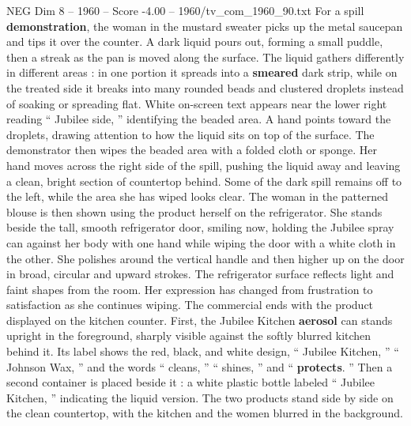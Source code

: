 \begin{textsample}{NEG Dim 8 – 1960 – Score -4.00 – 1960/tv\_com\_1960\_90.txt}
For a spill \textbf{demonstration}, the woman in the mustard sweater picks up the metal saucepan and tips it over the counter.
A dark liquid pours out, forming a small puddle, then a streak as the pan is moved along the surface.
The liquid gathers differently in different areas : in one portion it spreads into a \textbf{smeared} dark strip, while on the treated side it breaks into many rounded beads and clustered droplets instead of soaking or spreading flat.
White on-screen text appears near the lower right reading “ Jubilee side, ” identifying the beaded area.
A hand points toward the droplets, drawing attention to how the liquid sits on top of the surface.
The demonstrator then wipes the beaded area with a folded cloth or sponge.
Her hand moves across the right side of the spill, pushing the liquid away and leaving a clean, bright section of countertop behind.
Some of the dark spill remains off to the left, while the area she has wiped looks clear.
The woman in the patterned blouse is then shown using the product herself on the refrigerator.
She stands beside the tall, smooth refrigerator door, smiling now, holding the Jubilee spray can against her body with one hand while wiping the door with a white cloth in the other.
She polishes around the vertical handle and then higher up on the door in broad, circular and upward strokes.
The refrigerator surface reflects light and faint shapes from the room.
Her expression has changed from frustration to satisfaction as she continues wiping.
The commercial ends with the product displayed on the kitchen counter.
First, the Jubilee Kitchen \textbf{aerosol} can stands upright in the foreground, sharply visible against the softly blurred kitchen behind it.
Its label shows the red, black, and white design, “ Jubilee Kitchen, ” “ Johnson Wax, ” and the words “ cleans, ” “ shines, ” and “ \textbf{protects}. ” Then a second container is placed beside it : a white plastic bottle labeled “ Jubilee Kitchen, ” indicating the liquid version.
The two products stand side by side on the clean countertop, with the kitchen and the women blurred in the background.

\end{textsample}
